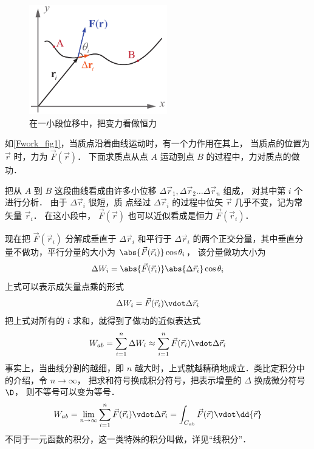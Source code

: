 

\begin{figure}[ht]
\centering
\includegraphics[width=6cm]{./figures/Fwork1.pdf}
\caption{在一小段位移中，把变力看做恒力}\label{Fwork_fig1}
\end{figure}

如\autoref{Fwork_fig1}，当质点沿着曲线运动时，有一个力作用在其上， 当质点的位置为 $\vec r$ 时，力为 $\vec F(\vec r)$． 下面求质点从点 $A$ 运动到点 $B$ 的过程中，力对质点的做功．

把从 $A$ 到 $B$ 这段曲线看成由许多小位移 $\Delta \vec r_1, \Delta \vec r_2 \dots \Delta \vec r_n$ 组成， 对其中第 $i$ 个进行分析． 由于 $\Delta \vec r_i$ 很短，质
点经过 $\Delta \vec r_i$ 的过程中位矢 $\vec r$ 几乎不变，记为常矢量 $\vec r_i$． 在这小段中，  $\vec F(\vec r)$ 也可以近似看成是恒力 $\vec F(\vec r_i)$． 

现在把 $\vec F(\vec r_i)$ 分解成垂直于 $\Delta \vec r_i$ 和平行于 $\Delta \vec r_i$ 的两个正交分量，其中垂直分量不做功，平行分量的大小为 $ \abs{\vec F(\vec r_i)} \cos \theta_i$， 该分量做功大小为
\begin{equation}
\Delta W_i = \abs{\vec F(\vec r_i)} \abs{\Delta \vec r_i} \cos \theta_i
\end{equation}
上式可以表示成矢量点乘的形式
\begin{equation}\label{Fwork_eq2}
\Delta W_i = \vec F(\vec r_i) \vdot \Delta \vec r_i
\end{equation}
把上式对所有的 $i$ 求和，就得到了做功的近似表达式
\begin{equation}
W_{ab} = \sum_{i = 1}^n \Delta W_i  \approx \sum_{i = 1}^n \vec F(\vec r_i) \vdot \Delta \vec r_i 
\end{equation} 
事实上，当曲线分割的越细，即 $n$ 越大时，上式就越精确地成立．类比定积分中的介绍，令 $n \to \infty $， 把求和符号换成积分符号，把表示增量的 $\Delta $ 换成微分符号 $\D$， 则不等号可以变为等号．
\begin{equation}
W_{ab} = \lim_{n \to \infty } \sum_{i = 1}^n \vec F(\vec r_i) \vdot \Delta \vec r_i  = \int_{C_{ab}} \vec F(\vec r) \vdot \dd{\vec r}
\end{equation} 
不同于一元函数的积分，这一类特殊的积分叫做，详见“线积分”．

